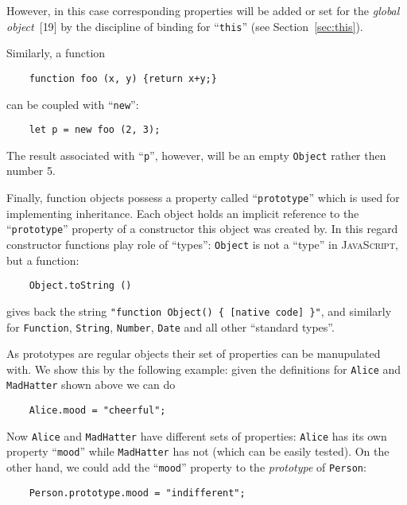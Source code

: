 \documentclass{article}
\newcommand{\js}{\textsc{JavaScript}\xspace}
\newcommand{\rf}[1]{[\textsc{#1}]}
\newcommand{\out}[1]{\texttt{#1}}
\begin{document}
However, in this case corresponding properties will be added or set for the \emph{global object}~\rf{19} by
the discipline of binding for ``\lstinline|this|'' (see Section~\ref{sec:this}).

Similarly, a function

\begin{lstlisting}
    function foo (x, y) {return x+y;}
\end{lstlisting}

can be coupled with ``\lstinline|new|'':

\begin{lstlisting}
    let p = new foo (2, 3);
\end{lstlisting}

The result associated with ``\lstinline|p|'', however, will be an empty \lstinline|Object| rather then number 5.

Finally, function objects possess a property called ``\lstinline|prototype|'' which is used for implementing
inheritance. Each object holds an implicit reference to the ``\lstinline|prototype|''
property of a constructor this object was created by. In this regard constructor functions play role of ``types'':
\lstinline|Object| is not a ``type'' in \js, but a function:

\begin{lstlisting}
    Object.toString ()
\end{lstlisting}

gives back the string \out{"function Object() \{ [native code] \}"}, and similarly for \lstinline|Function|,
\lstinline|String|, \lstinline|Number|, \lstinline|Date| and  all other ``standard types''.

As prototypes are regular objects their set of properties can be manupulated with. We show this by the following
example: given the definitions for \lstinline|Alice| and \lstinline|MadHatter| shown above we can do

\begin{lstlisting}
    Alice.mood = "cheerful";
\end{lstlisting}

Now \lstinline|Alice| and \lstinline|MadHatter| have different sets of properties: \lstinline|Alice| has its
own property ``\lstinline|mood|'' while \lstinline|MadHatter| has not (which can be easily
tested). On the other hand, we could add the ``\lstinline|mood|'' property to the \emph{prototype} of
\lstinline|Person|:

\begin{lstlisting}
    Person.prototype.mood = "indifferent";
\end{lstlisting}
\end{document}
